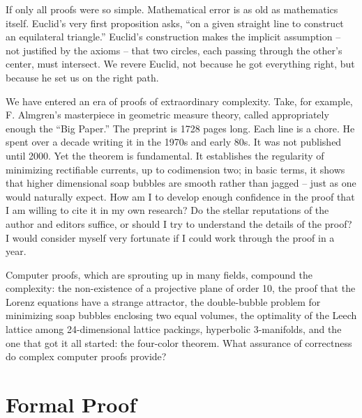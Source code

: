 \documentclass{llncs}
\begin{document}
If only all proofs were so simple.  
Mathematical error is as old as mathematics itself.
Euclid's very first proposition asks, ``on a given straight line
to construct an equilateral triangle.''  Euclid's construction
makes the implicit assumption -- not justified by the axioms -- that
two circles, each passing through the other's center, must intersect.
We revere Euclid, not because he got everything right, but because
he set us on the right path.

We have entered an era of proofs of extraordinary complexity.
Take, for example, F. Almgren's masterpiece in geometric measure
theory, called appropriately enough the ``Big Paper.'' 
The preprint is
1728 pages long. Each line is a chore. He spent over a decade writing it in the 1970s and
early 80s.  It was not published until 2000.  Yet the theorem
is fundamental.  It establishes the regularity of minimizing
rectifiable currents, up to codimension two;  in basic terms, 
it shows that higher dimensional soap bubbles are smooth
rather than jagged -- just
as one would naturally expect.  How am I to develop enough confidence
in the proof that I am willing to cite it in my own research?
Do the stellar reputations of the author
and editors suffice, or should I try to understand the details of the
proof?  I
would consider myself very fortunate if I could work through the proof
in a year.

Computer proofs, which are sprouting up in many fields,
compound the complexity: 
the non-existence of a projective plane of order 10,
the proof that the Lorenz equations have a strange attractor,
the double-bubble problem for minimizing soap bubbles enclosing
two equal volumes, the optimality of the Leech lattice among
24-dimensional lattice packings, hyperbolic $3$-manifolds,
and the one that got it all started: the four-color theorem.
What assurance of correctness do complex computer proofs provide?



\section{Formal Proof}
\end{document}

